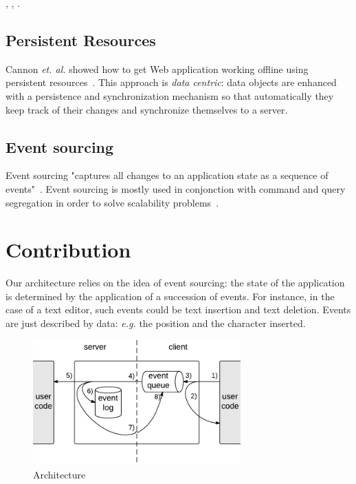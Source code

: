 \documentclass{llncs}
\begin{document}
\cite{Yang2000_OfflineMode}, \cite{Marco11_InterruptionResilience}, \cite{Kao12_WOPRE}.

\subsection{Persistent Resources}

Cannon \emph{et. al.} showed how to get Web application working offline using persistent resources~\cite{Cannon10_Persistence}. This approach is \emph{data centric}: data objects are enhanced with a persistence and synchronization mechanism so that automatically they keep track of their changes and synchronize themselves to a server.

\cite{Benson10_SyncKit}

\subsection{Event sourcing}

Event sourcing "captures all changes to an application state as a sequence of events"~\cite{Fowler05_ES}. Event sourcing is mostly used in conjonction with command and query segregation in order to solve scalability problems~\cite{Betts13_CQRS}.

\section{Contribution}

Our architecture relies on the idea of event sourcing: the state of the application is determined by the application of a succession of events. For instance, in the case of a text editor, such events could be text insertion and text deletion. Events are just described by data: \emph{e.g.} the position and the character inserted.

\begin{figure}
\centering
\includegraphics[width=8cm]{arch.pdf}
\caption{Architecture}
\label{fig-arch}
\end{figure}
\end{document}
